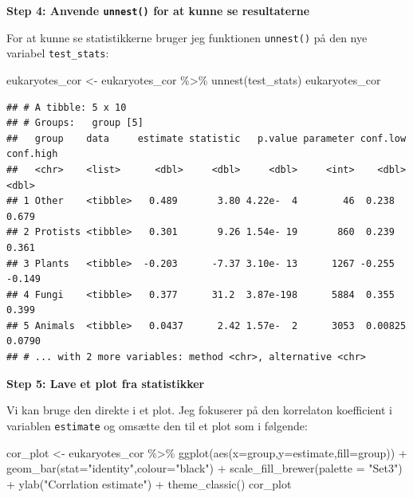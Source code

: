 \documentclass[
]{book}
\newenvironment{Shaded}{\begin{snugshade}}{\end{snugshade}}
\newcommand{\AttributeTok}[1]{\textcolor[rgb]{0.77,0.63,0.00}{#1}}
\newcommand{\FunctionTok}[1]{\textcolor[rgb]{0.00,0.00,0.00}{#1}}
\newcommand{\NormalTok}[1]{#1}
\newcommand{\OtherTok}[1]{\textcolor[rgb]{0.56,0.35,0.01}{#1}}
\newcommand{\SpecialCharTok}[1]{\textcolor[rgb]{0.00,0.00,0.00}{#1}}
\newcommand{\StringTok}[1]{\textcolor[rgb]{0.31,0.60,0.02}{#1}}
\begin{document}
\textbf{Step 4: Anvende \texttt{unnest()} for at kunne se resultaterne}

For at kunne se statistikkerne bruger jeg funktionen \texttt{unnest()} på den nye variabel \texttt{test\_stats}:

\begin{Shaded}
\begin{Highlighting}[]
\NormalTok{eukaryotes\_cor }\OtherTok{\textless{}{-}}\NormalTok{ eukaryotes\_cor }\SpecialCharTok{\%\textgreater{}\%}
  \FunctionTok{unnest}\NormalTok{(test\_stats)}
\NormalTok{eukaryotes\_cor}
\end{Highlighting}
\end{Shaded}

\begin{verbatim}
## # A tibble: 5 x 10
## # Groups:   group [5]
##   group    data     estimate statistic   p.value parameter conf.low conf.high
##   <chr>    <list>      <dbl>     <dbl>     <dbl>     <int>    <dbl>     <dbl>
## 1 Other    <tibble>   0.489       3.80 4.22e-  4        46  0.238      0.679 
## 2 Protists <tibble>   0.301       9.26 1.54e- 19       860  0.239      0.361 
## 3 Plants   <tibble>  -0.203      -7.37 3.10e- 13      1267 -0.255     -0.149 
## 4 Fungi    <tibble>   0.377      31.2  3.87e-198      5884  0.355      0.399 
## 5 Animals  <tibble>   0.0437      2.42 1.57e-  2      3053  0.00825    0.0790
## # ... with 2 more variables: method <chr>, alternative <chr>
\end{verbatim}

\textbf{Step 5: Lave et plot fra statistikker}

Vi kan bruge den direkte i et plot. Jeg fokuserer på den korrelaton koefficient i variablen \texttt{estimate} og omsætte den til et plot som i følgende:

\begin{Shaded}
\begin{Highlighting}[]
\NormalTok{cor\_plot }\OtherTok{\textless{}{-}}\NormalTok{ eukaryotes\_cor }\SpecialCharTok{\%\textgreater{}\%}
  \FunctionTok{ggplot}\NormalTok{(}\FunctionTok{aes}\NormalTok{(}\AttributeTok{x=}\NormalTok{group,}\AttributeTok{y=}\NormalTok{estimate,}\AttributeTok{fill=}\NormalTok{group)) }\SpecialCharTok{+} 
  \FunctionTok{geom\_bar}\NormalTok{(}\AttributeTok{stat=}\StringTok{"identity"}\NormalTok{,}\AttributeTok{colour=}\StringTok{"black"}\NormalTok{) }\SpecialCharTok{+}
  \FunctionTok{scale\_fill\_brewer}\NormalTok{(}\AttributeTok{palette =} \StringTok{"Set3"}\NormalTok{) }\SpecialCharTok{+} 
  \FunctionTok{ylab}\NormalTok{(}\StringTok{"Corrlation estimate"}\NormalTok{) }\SpecialCharTok{+}
  \FunctionTok{theme\_classic}\NormalTok{() }
\NormalTok{cor\_plot}
\end{Highlighting}
\end{Shaded}
\end{document}
